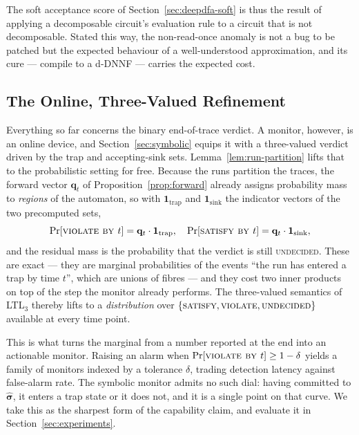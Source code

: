 The soft acceptance score of Section~\ref{sec:deepdfa-soft} is thus the result of applying a decomposable circuit's evaluation rule to a circuit that is not decomposable. Stated this way, the non-read-once anomaly is not a bug to be patched but the expected behaviour of a well-understood approximation, and its cure --- compile to a d-DNNF --- carries the expected cost.

\subsection{The Online, Three-Valued Refinement}
\label{sec:prob-online}

Everything so far concerns the binary end-of-trace verdict. A monitor, however, is an online device, and Section~\ref{sec:symbolic} equips it with a three-valued verdict driven by the trap and accepting-sink sets. Lemma~\ref{lem:run-partition} lifts that to the probabilistic setting for free. Because the runs partition the traces, the forward vector $\mathbf{q}_t$ of Proposition~\ref{prop:forward} already assigns probability mass to \emph{regions} of the automaton, so with $\mathbf{1}_{\mathrm{trap}}$ and $\mathbf{1}_{\mathrm{sink}}$ the indicator vectors of the two precomputed sets,
\begin{equation}
  \Pr[\textsc{violate by } t] = \mathbf{q}_t \cdot \mathbf{1}_{\mathrm{trap}},
  \quad
  \Pr[\textsc{satisfy by } t] = \mathbf{q}_t \cdot \mathbf{1}_{\mathrm{sink}},
  \label{eq:prob-three-valued}
\end{equation}
and the residual mass is the probability that the verdict is still \textsc{undecided}. These are exact --- they are marginal probabilities of the events ``the run has entered a trap by time $t$'', which are unions of fibres --- and they cost two inner products on top of the step the monitor already performs. The three-valued semantics of LTL$_3$ thereby lifts to a \emph{distribution} over $\{\textsc{satisfy}, \textsc{violate}, \textsc{undecided}\}$ available at every time point.

This is what turns the marginal from a number reported at the end into an actionable monitor. Raising an alarm when $\Pr[\textsc{violate by } t] \ge 1 - \delta$ yields a family of monitors indexed by a tolerance $\delta$, trading detection latency against false-alarm rate. The symbolic monitor admits no such dial: having committed to $\hat{\boldsymbol{\sigma}}$, it enters a trap state or it does not, and it is a single point on that curve. We take this as the sharpest form of the capability claim, and evaluate it in Section~\ref{sec:experiments}.

